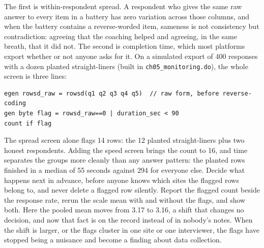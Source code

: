 \documentclass[
    a4paper,
    fontsize=10pt,
    twoside=true,
    numbers=noenddot,
]{kaobook}
\begin{document}
The first is within-respondent spread. A respondent who gives the same raw answer to every item in a battery has zero variation across those columns, and when the battery contains a reverse-worded item, sameness is not consistency but contradiction: agreeing that the coaching helped and agreeing, in the same breath, that it did not. The second is completion time, which most platforms export whether or not anyone asks for it. On a simulated export of 400 responses with a dozen planted straight-liners (built in \texttt{ch05\_monitoring.do}), the whole screen is three lines:
\par
{\footnotesize
\begin{verbatim}
egen rowsd_raw = rowsd(q1 q2 q3 q4 q5)  // raw form, before reverse-coding
gen byte flag = rowsd_raw==0 | duration_sec < 90
count if flag
\end{verbatim}
}
The spread screen alone flags 14 rows: the 12 planted straight-liners plus two honest respondents. Adding the speed screen brings the count to 16, and time separates the groups more cleanly than any answer pattern: the planted rows finished in a median of 55 seconds against 294 for everyone else. Decide what happens next in advance, before anyone knows which sites the flagged rows belong to, and never delete a flagged row silently. Report the flagged count beside the response rate, rerun the scale mean with and without the flags, and show both. Here the pooled mean moves from 3.17 to 3.16, a shift that changes no decision, and now that fact is on the record instead of in nobody's notes. When the shift is larger, or the flags cluster in one site or one interviewer, the flags have stopped being a nuisance and become a finding about data collection.

\end{document}
